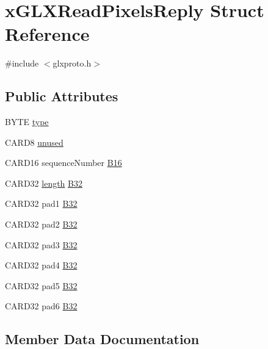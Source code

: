 \hypertarget{structx_g_l_x_read_pixels_reply}{}\section{x\+G\+L\+X\+Read\+Pixels\+Reply Struct Reference}
\label{structx_g_l_x_read_pixels_reply}


{\ttfamily \#include $<$glxproto.\+h$>$}

\subsection*{Public Attributes}
\begin{DoxyCompactItemize}
\item 
B\+Y\+TE \hyperlink{structx_g_l_x_read_pixels_reply_a21205d5c12568fa49ae68e7b03866c72}{type}
\item 
C\+A\+R\+D8 \hyperlink{structx_g_l_x_read_pixels_reply_a79ea97e4282900e7b4db32c90c110454}{unused}
\item 
C\+A\+R\+D16 sequence\+Number \hyperlink{structx_g_l_x_read_pixels_reply_a9263262088c663f4d953bad071e177da}{B16}
\item 
C\+A\+R\+D32 \hyperlink{glcorearb_8h_ab9c919755bde3b34349e23a32b4e0fa7}{length} \hyperlink{structx_g_l_x_read_pixels_reply_a8f72ef0d92738d0198a11b37a623bb92}{B32}
\item 
C\+A\+R\+D32 pad1 \hyperlink{structx_g_l_x_read_pixels_reply_afe2f3c4c7e8d9e6acc1e35429fc01260}{B32}
\item 
C\+A\+R\+D32 pad2 \hyperlink{structx_g_l_x_read_pixels_reply_a99470b1e1e5208810648e2dc7a1c9f64}{B32}
\item 
C\+A\+R\+D32 pad3 \hyperlink{structx_g_l_x_read_pixels_reply_a7d219b3a8172748da15ccba5d57cd165}{B32}
\item 
C\+A\+R\+D32 pad4 \hyperlink{structx_g_l_x_read_pixels_reply_a5f5890001a7ffa5409cde2169ad590a4}{B32}
\item 
C\+A\+R\+D32 pad5 \hyperlink{structx_g_l_x_read_pixels_reply_a5feb0004540aadd81c14ee4a609b1ec8}{B32}
\item 
C\+A\+R\+D32 pad6 \hyperlink{structx_g_l_x_read_pixels_reply_ae325dafea6416f14cd0edc74e943643f}{B32}
\end{DoxyCompactItemize}


\subsection{Member Data Documentation}
\mbox{\label{structx_g_l_x_read_pixels_reply_a9263262088c663f4d953bad071e177da}} 

